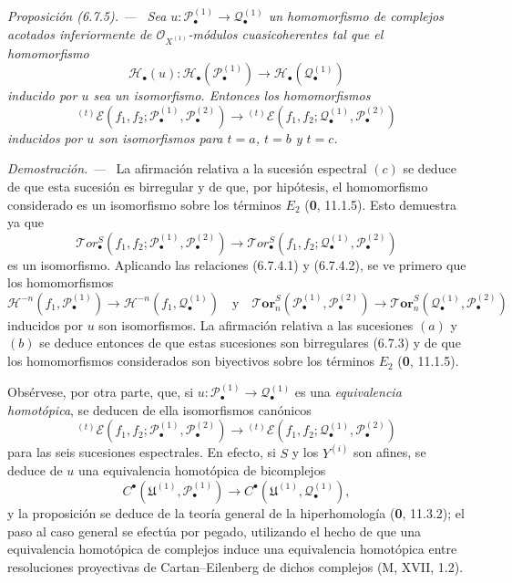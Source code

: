 \documentclass[10pt,oneside]{book}
\newenvironment{proposition}[1][]{\par\medskip\noindent\itshape Proposición (#1). ---\ }{\par}
\newenvironment{proof}{\par\medskip\noindent\textit{Demostración. ---\ }}{\par}
\begin{document}
\begin{proposition}[6.7.5]
\label{III.6.7.5}
Sea $u:\mathscr P_\bullet^{(1)}\to\mathscr Q_\bullet^{(1)}$ un
homomorfismo de complejos acotados inferiormente de
$\mathscr O_{X^{(1)}}$-módulos cuasicoherentes tal que el homomorfismo
\[
  \mathscr H_\bullet(u):
  \mathscr H_\bullet(\mathscr P_\bullet^{(1)})
  \longrightarrow
  \mathscr H_\bullet(\mathscr Q_\bullet^{(1)})
\]
inducido por $u$ sea un isomorfismo. Entonces los homomorfismos
\[
  {}^{(t)}\mathscr E
  (f_1,f_2;\mathscr P_\bullet^{(1)},\mathscr P_\bullet^{(2)})
  \longrightarrow
  {}^{(t)}\mathscr E
  (f_1,f_2;\mathscr Q_\bullet^{(1)},\mathscr P_\bullet^{(2)})
\]
inducidos por $u$ son isomorfismos para $t=a$, $t=b$ y $t=c$.
\end{proposition}

\begin{proof}
La afirmación relativa a la sucesión espectral $(c)$ se deduce de que esta
sucesión es birregular y de que, por hipótesis, el homomorfismo considerado es
un isomorfismo sobre los términos $E_2$ (\textbf{0}, 11.1.5). Esto
demuestra ya que
\[
  \mathscr T\!or_\bullet^S
  (f_1,f_2;\mathscr P_\bullet^{(1)},\mathscr P_\bullet^{(2)})
  \longrightarrow
  \mathscr T\!or_\bullet^S
  (f_1,f_2;\mathscr Q_\bullet^{(1)},\mathscr P_\bullet^{(2)})
\]
es un isomorfismo. Aplicando las relaciones (6.7.4.1) y (6.7.4.2), se ve
primero que los homomorfismos
\[
  \mathcal H^{-n}(f_1,\mathscr P_\bullet^{(1)})
  \longrightarrow
  \mathcal H^{-n}(f_1,\mathscr Q_\bullet^{(1)})
  \quad\text{y}\quad
  \boldsymbol{\mathscr{T}\!or}_n^S
  (\mathscr P_\bullet^{(1)},\mathscr P_\bullet^{(2)})
  \longrightarrow
  \boldsymbol{\mathscr{T}\!or}_n^S
  (\mathscr Q_\bullet^{(1)},\mathscr P_\bullet^{(2)})
\]
inducidos por $u$ son isomorfismos. La afirmación relativa a las sucesiones
$(a)$ y $(b)$ se deduce entonces de que estas sucesiones son birregulares
(6.7.3) y de que los homomorfismos considerados son biyectivos sobre los
términos $E_2$ (\textbf{0}, 11.1.5).

Obsérvese, por otra parte, que, si
$u:\mathscr P_\bullet^{(1)}\to\mathscr Q_\bullet^{(1)}$ es una
\emph{equivalencia homotópica}, se deducen de ella isomorfismos canónicos
\[
  {}^{(t)}\mathscr E
  (f_1,f_2;\mathscr P_\bullet^{(1)},\mathscr P_\bullet^{(2)})
  \longrightarrow
  {}^{(t)}\mathscr E
  (f_1,f_2;\mathscr Q_\bullet^{(1)},\mathscr P_\bullet^{(2)})
\]
para las seis sucesiones espectrales. En efecto, si $S$ y los $Y^{(i)}$ son
afines, se deduce de $u$ una equivalencia homotópica de bicomplejos
\[
  C^\bullet(\mathfrak U^{(1)},\mathscr P_\bullet^{(1)})
  \longrightarrow
  C^\bullet(\mathfrak U^{(1)},\mathscr Q_\bullet^{(1)}),
\]
y la proposición se deduce de la teoría general de la hiperhomología
(\textbf{0}, 11.3.2); el paso al caso general se efectúa por pegado,
utilizando el hecho de que una equivalencia homotópica de complejos induce
una equivalencia homotópica entre resoluciones proyectivas de
Cartan--Eilenberg de dichos complejos (M, XVII, 1.2).
\end{proof}
\end{document}
